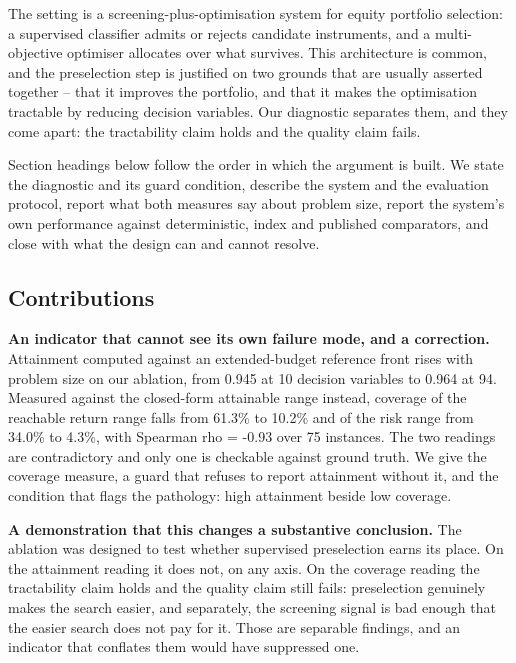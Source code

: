 \documentclass[preprint,11pt,authoryear]{elsarticle}
\begin{document}
The setting is a screening-plus-optimisation system for equity portfolio selection: a supervised classifier admits or rejects candidate instruments, and a multi-objective optimiser allocates over what survives. This architecture is common, and the preselection step is justified on two grounds that are usually asserted together -- that it improves the portfolio, and that it makes the optimisation tractable by reducing decision variables. Our diagnostic separates them, and they come apart: the tractability claim holds and the quality claim fails.

Section headings below follow the order in which the argument is built. We state the diagnostic and its guard condition, describe the system and the evaluation protocol, report what both measures say about problem size, report the system's own performance against deterministic, index and published comparators, and close with what the design can and cannot resolve.


\subsection{Contributions}\label{sec:contributions}

\textbf{An indicator that cannot see its own failure mode, and a correction.} Attainment computed against an extended-budget reference front rises with problem size on our ablation, from 0.945 at 10 decision variables to 0.964 at 94. Measured against the closed-form attainable range instead, coverage of the reachable return range falls from 61.3\% to 10.2\% and of the risk range from 34.0\% to 4.3\%, with Spearman rho = -0.93 over 75 instances. The two readings are contradictory and only one is checkable against ground truth. We give the coverage measure, a guard that refuses to report attainment without it, and the condition that flags the pathology: high attainment beside low coverage.

\textbf{A demonstration that this changes a substantive conclusion.} The ablation was designed to test whether supervised preselection earns its place. On the attainment reading it does not, on any axis. On the coverage reading the tractability claim holds and the quality claim still fails: preselection genuinely makes the search easier, and separately, the screening signal is bad enough that the easier search does not pay for it. Those are separable findings, and an indicator that conflates them would have suppressed one.
\end{document}

